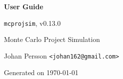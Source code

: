 \documentclass[11pt,b5paper,twoside,openright]{report}
\begin{document}
\begin{titlepage}
  \centering
  \vspace*{2.0cm}
  {\Huge\bfseries\color{brandblue}User Guide\par}
  \vspace{1.2cm}
  {\Large \texttt{mcprojsim}, v0.13.0\par}
  \vspace{1.2cm}
  {\Large Monte Carlo Project Simulation\par}
  \vfill
  {\large Johan Persson \texttt{<johan162@gmail.com>}\par}
  {\large Generated on \today\par}
\end{titlepage}

\cleardoublepage

\tableofcontents
\cleardoublepage


\end{document}

